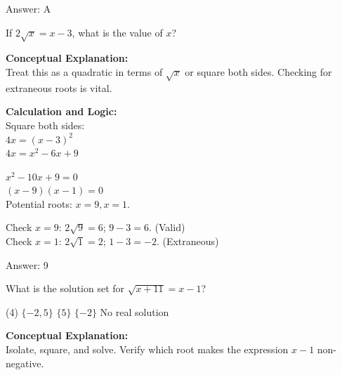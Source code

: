 \documentclass[11pt,paper=a4,answers]{exam}
\begin{document}
\begin{questions}
\begin{solution}
Answer: \colorbox{yellow!100}{A}
\end{solution}

\vspace{40pt}

\question
If $2\sqrt{x} = x - 3$, what is the value of $x$?

\begin{solution}
\textbf{Conceptual Explanation:} \\
Treat this as a quadratic in terms of $\sqrt{x}$ or square both sides. Checking for extraneous roots is vital.

\vspace{20pt}

\textbf{Calculation and Logic:} \\
Square both sides: \\
$4x = (x - 3)^2$ \\
$4x = x^2 - 6x + 9$

\vspace{10pt}

$x^2 - 10x + 9 = 0$ \\
$(x - 9)(x - 1) = 0$ \\
Potential roots: $x = 9, x = 1$.

\vspace{10pt}

Check $x = 9$: $2\sqrt{9} = 6$; $9 - 3 = 6$. (Valid) \\
Check $x = 1$: $2\sqrt{1} = 2$; $1 - 3 = -2$. (Extraneous)

\vspace{25pt}

Answer: \colorbox{yellow!100}{9}
\end{solution}

\vspace{40pt}

\question
What is the solution set for $\sqrt{x + 11} = x - 1$?
\begin{tasks}(4)
    \task $\{-2, 5\}$
    \task $\{5\}$
    \task $\{-2\}$
    \task No real solution
\end{tasks}

\begin{solution}
\textbf{Conceptual Explanation:} \\
Isolate, square, and solve. Verify which root makes the expression $x-1$ non-negative.


\end{solution}
\end{questions}
\end{document}
